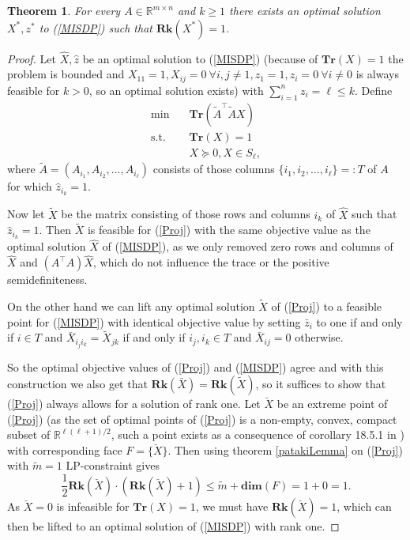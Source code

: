 \documentclass[a4paper,11pt,1p]{elsarticle}
\newtheorem{thm}{Theorem}
\newcommand{\T}{^{\top}}
\newcommand{\Tr}{\textbf{Tr}}
\newcommand{\Rk}{\textbf{Rk}}
\newcommand{\R}{\mathds{R}}
\begin{document}
\begin{thm}\label{Rk1thm}
 For every $A \in \R^{m \times n}$ and $k \geq 1$ there exists an optimal solution $X^*, z^*$ to (\ref{MISDP}) such that $\Rk(X^*) = 1$. 
\end{thm}
\begin{proof}
 Let $\hat{X}, \hat{z}$ be an optimal solution to (\ref{MISDP}) (because of $\Tr(X) = 1$ the problem is bounded and $X_{11} = 1, X_{ij} = 0 \ \forall i,j \neq 1, z_1 = 1, z_i = 0 \ \forall i \neq 0$ is always feasible for $k > 0$,
 so an optimal solution exists)
 with $\sum_{i=1}^n z_i = \ell \leq k$. Define
 \begin{align}\label{Proj}
 \text{min} \quad & \Tr(\tilde{A}\T\tilde{A}X) \nonumber \\
 \text{s.t.} \quad & \Tr(X) = 1 \tag{Proj} \\
 & X \succeq 0 , X \in S_\ell, \nonumber
 \end{align}
where $\tilde{A} = (A_{i_1}, A_{i_2}, ..., A_{i_\ell})$ consists of those
columns $\{{i_1}, {i_2}, ..., {i_\ell}\} =: T$ of $A$ for which
$\hat{z}_{i_k} = 1$.

Now let $\tilde{X}$ be the matrix consisting of those rows and columns 
$i_k$ of $\hat{X}$ such that $\hat{z}_{i_k} = 1$. Then $\tilde{X}$ is feasible for (\ref{Proj}) with the same objective value as the optimal solution $\hat{X}$ of (\ref{MISDP}), as we only removed zero rows and columns of $\hat{X}$ 
and $(A\T A)\hat{X}$, which do not influence the trace or the positive
semidefiniteness.

On the other hand we can lift any optimal solution $\tilde{X}$ of (\ref{Proj}) to a feasible point for (\ref{MISDP}) with identical objective value by setting $\bar{z}_i$ to one if and only if $i \in T$
and $\bar{X}_{i_j i_k} = \tilde{X}_{jk}$ if and only if $i_j, i_k \in T$
and $\bar{X}_{ij}=0$ otherwise.

So the optimal objective values of (\ref{Proj}) and (\ref{MISDP}) agree and with this construction we also get that 
$\Rk(\bar{X}) = \Rk(\tilde{X})$, so it suffices to show that (\ref{Proj}) always allows for a solution of rank one.
Let $\breve{X}$ be an extreme point of (\ref{Proj}) (as the set of optimal points of (\ref{Proj}) is a non-empty, convex, compact subset of $\R^{\ell(\ell+1)/2}$, such a point exists as a consequence of corollary 18.5.1 in
\cite{Roc70}) with corresponding face $F=\{\breve{X}\}$. Then using theorem \ref{patakiLemma} on (\ref{Proj}) with $\tilde{m} = 1$ LP-constraint gives
\begin{equation*}
 \frac{1}{2}\Rk(\breve{X})\cdot(\Rk(\breve{X})+1) \leq \tilde{m} + \textbf{dim}(F) = 1 + 0 = 1.
\end{equation*}
As $\breve{X}=0$ is infeasible for $\Tr(X)=1$, we must have $\Rk(\breve{X}) = 1$, which can then be lifted to an optimal solution of (\ref{MISDP}) with rank one.
\end{proof}
\end{document}
